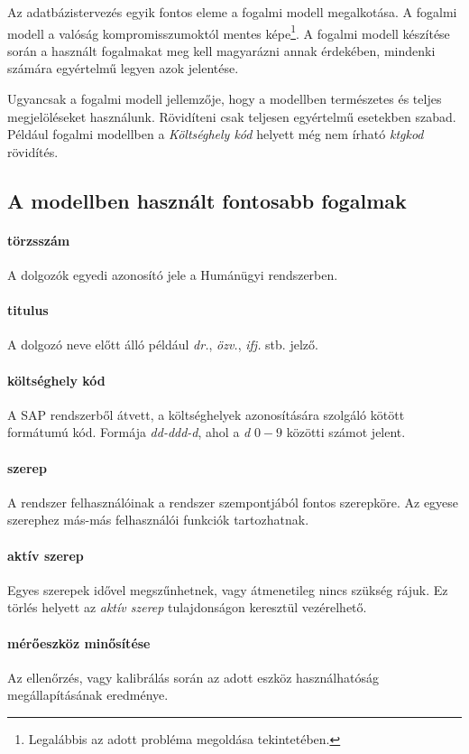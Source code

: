 Az adatbázistervezés egyik fontos eleme a fogalmi modell megalkotása. A fogalmi modell
a valóság kompromisszumoktól mentes képe\footnote{Legalábbis az adott probléma
megoldása tekintetében.}. A fogalmi modell készítése során a használt fogalmakat meg
kell magyarázni annak érdekében, mindenki számára egyértelmű legyen azok jelentése.

Ugyancsak a fogalmi modell jellemzője, hogy a modellben természetes és teljes
megjelöléseket használunk. Rövidíteni csak teljesen egyértelmű esetekben szabad.
Például fogalmi modellben a \textit{Költséghely kód} helyett még nem írható \textit{ktgkod}
rövidítés. 

\subsection{A modellben használt fontosabb fogalmak}
\paragraph*{törzsszám} A dolgozók egyedi azonosító jele a Humánügyi rendszerben. 
\paragraph*{titulus} A dolgozó neve előtt álló például \textit{dr.}, \textit{özv.}, \textit{ifj.} stb.
jelző.
\paragraph*{költséghely kód} A SAP rendszerből átvett, a költséghelyek azonosítására 
szolgáló kötött formátumú kód. Formája \textit{dd-ddd-d}, ahol a \textit{d} $0-9$ közötti
számot jelent.
\paragraph*{szerep} A rendszer felhasználóinak a rendszer szempontjából fontos
szerepköre. Az egyese szerephez más-más felhasználói funkciók tartozhatnak.
\paragraph*{aktív szerep} Egyes szerepek idővel megszűnhetnek, vagy átmenetileg
nincs szükség rájuk. Ez törlés helyett az \textit{aktív szerep} tulajdonságon keresztül vezérelhető.
\paragraph*{mérőeszköz minősítése} Az ellenőrzés, vagy kalibrálás során az adott
eszköz használhatóság megállapításának eredménye.

